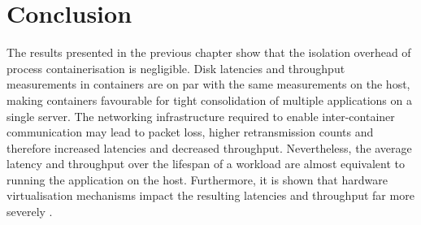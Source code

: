 \chapter{Conclusion}
\label{ch:conclusion}
The results presented in the previous chapter show that the isolation overhead 
of process containerisation is negligible. Disk latencies and throughput measurements 
in containers are on par with the same measurements on the host, making containers 
favourable for tight consolidation of multiple applications on a single server.
The networking infrastructure required to enable inter-container communication may lead to 
packet loss, higher retransmission counts and therefore increased latencies and decreased throughput.
Nevertheless, the average latency and throughput over the lifespan of a workload are almost
equivalent to running the application on the host. Furthermore, it is shown that 
hardware virtualisation mechanisms impact the resulting latencies and throughput far more 
severely \cite{https://doi.org/10.1002/cpe.5693} \cite{8457798}.